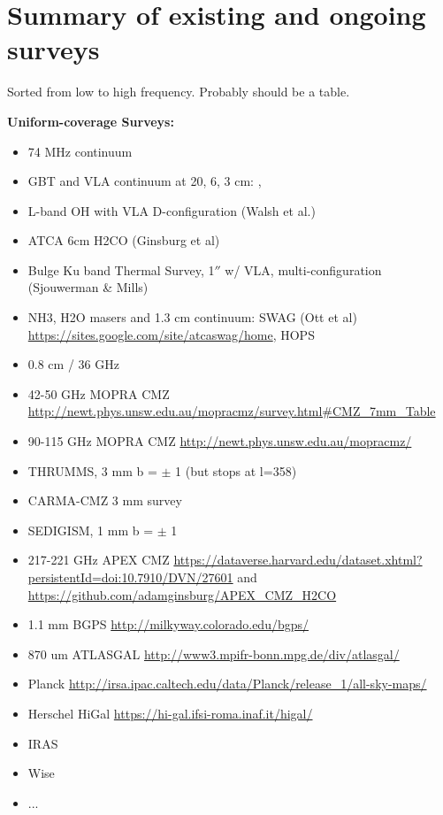 \section{Summary of existing and ongoing surveys}
Sorted from low to high frequency.  Probably should be a table.

{\bf Uniform-coverage Surveys:}
\begin{itemize}
    \item 74 MHz continuum \citep{Yusef-Zadeh2013c}
    \item GBT and VLA continuum at 20, 6, 3 cm: \citet{Law2008a}, \citet{Law2008b}
    \item L-band OH with VLA D-configuration (Walsh et al.)
    \item ATCA 6cm H2CO (Ginsburg et al)
    \item Bulge Ku band Thermal Survey, 1$''$ w/ VLA, multi-configuration (Sjouwerman \& Mills)
    \item NH3, H2O masers and 1.3 cm continuum: SWAG (Ott et al) \url{https://sites.google.com/site/atcaswag/home}, HOPS \citep{Walsh2011a}
    \item 0.8 cm / 36 GHz \citep{Yusef-Zadeh2013a}
    \item 42-50 GHz MOPRA CMZ \url{http://newt.phys.unsw.edu.au/mopracmz/survey.html#CMZ_7mm_Table} \citep{Jones2013}
    \item 90-115 GHz MOPRA CMZ \url{http://newt.phys.unsw.edu.au/mopracmz/} \citep{Jones2012a}
    \item THRUMMS, 3 mm b = $\pm$ 1 (but stops at l=358)
    \item CARMA-CMZ 3 mm survey
    \item SEDIGISM, 1 mm b = $\pm$ 1 
    \item 217-221 GHz APEX CMZ \url{https://dataverse.harvard.edu/dataset.xhtml?persistentId=doi:10.7910/DVN/27601} and \url{https://github.com/adamginsburg/APEX_CMZ_H2CO}
    \item 1.1 mm BGPS \url{http://milkyway.colorado.edu/bgps/}
    \item 870 um ATLASGAL \url{http://www3.mpifr-bonn.mpg.de/div/atlasgal/}
    \item Planck \url{http://irsa.ipac.caltech.edu/data/Planck/release_1/all-sky-maps/}
    \item Herschel HiGal \url{https://hi-gal.ifsi-roma.inaf.it/higal/}
    \item IRAS
    \item Wise
    \item ...
\end{itemize}

